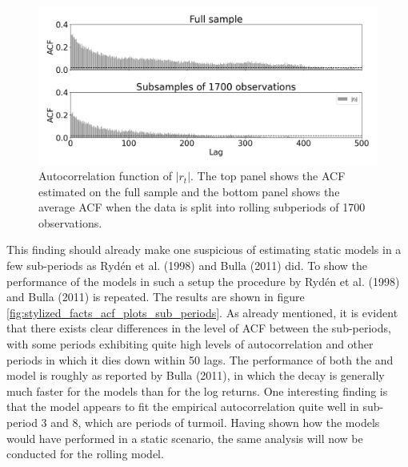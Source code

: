 \begin{figure}[H] 
    \centering
    \includegraphics[width=1.0\textwidth]{analysis/stylized_facts/images/acf_data.png}
    \caption[Autocorrelation function of $|r_t|$ on full sample and subsamples]{Autocorrelation function of $|r_t|$. The top panel shows the ACF estimated on the full sample and the bottom panel shows the average ACF when the data is split into rolling subperiods of 1700 observations.}
    \label{fig:stylized_facts_acf_data} 
\end{figure}

This finding should already make one suspicious of estimating static models in a few sub-periods as Rydén et al. (1998) and Bulla (2011) did. To show the performance of the models in such a setup the procedure by Rydén et al. (1998) and Bulla (2011) is repeated. The results are shown in figure \ref{fig:stylized_facts_acf_plots_sub_periods}. As already mentioned, it is evident that there exists clear differences in the level of ACF between the sub-periods, with some periods exhibiting quite high levels of autocorrelation and other periods in which it dies down within 50 lags. The performance of both the \mle and \jump model is roughly as reported by Bulla (2011), in which the decay is generally much faster for the models than for the log returns. One interesting finding is that the \mle model appears to fit the empirical autocorrelation quite well in sub-period 3 and 8, which are periods of turmoil. Having shown how the models would have performed in a static scenario, the same analysis will now be conducted for the rolling model.

